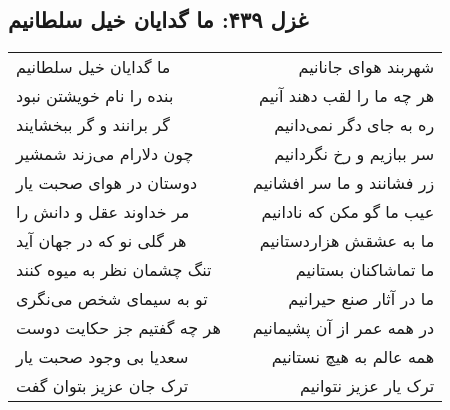 \begin{center}
\section*{غزل ۴۳۹: ما گدایان خیل سلطانیم}
\label{sec:439}
\begin{longtable}{l p{0.5cm} r}
ما گدایان خیل سلطانیم
&&
شهربند هوای جانانیم
\\
بنده را نام خویشتن نبود
&&
هر چه ما را لقب دهند آنیم
\\
گر برانند و گر ببخشایند
&&
ره به جای دگر نمی‌دانیم
\\
چون دلارام می‌زند شمشیر
&&
سر ببازیم و رخ نگردانیم
\\
دوستان در هوای صحبت یار
&&
زر فشانند و ما سر افشانیم
\\
مر خداوند عقل و دانش را
&&
عیب ما گو مکن که نادانیم
\\
هر گلی نو که در جهان آید
&&
ما به عشقش هزاردستانیم
\\
تنگ چشمان نظر به میوه کنند
&&
ما تماشاکنان بستانیم
\\
تو به سیمای شخص می‌نگری
&&
ما در آثار صنع حیرانیم
\\
هر چه گفتیم جز حکایت دوست
&&
در همه عمر از آن پشیمانیم
\\
سعدیا بی وجود صحبت یار
&&
همه عالم به هیچ نستانیم
\\
ترک جان عزیز بتوان گفت
&&
ترک یار عزیز نتوانیم
\\
\end{longtable}
\end{center}
